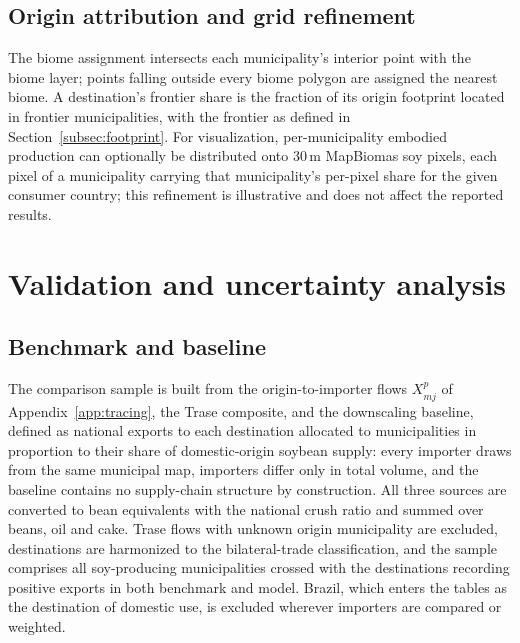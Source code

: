 \documentclass[pdflatex,sn-nature]{sn-jnl}%
\begin{document}
\subsection{Origin attribution and grid refinement}\label{subsubsec:attribution}
The biome assignment intersects each municipality's interior point with
the biome layer; points falling outside every biome polygon are assigned
the nearest biome. A destination's frontier share is the fraction of its
origin footprint located in frontier municipalities, with the frontier as
defined in Section~\ref{subsec:footprint}. For visualization, per-municipality embodied production can
optionally be distributed onto 30\,m MapBiomas soy pixels, each pixel of a
municipality carrying that municipality's per-pixel share for the given
consumer country; this refinement is illustrative and does not affect the
reported results.

\section{Validation and uncertainty analysis}\label{app:validation}

\subsection{Benchmark and baseline}\label{subsubsec:benchmarks}
The comparison sample is built from the origin-to-importer flows
$X^p_{mj}$ of Appendix~\ref{app:tracing}, the Trase composite, and the
downscaling baseline, defined as national exports to each destination
allocated to municipalities in proportion to their share of
domestic-origin soybean supply: every importer draws from the same
municipal map, importers differ only in total volume, and the baseline
contains no supply-chain structure by construction. All three sources
are converted to bean equivalents with the national crush ratio and
summed over beans, oil and cake. Trase flows with unknown origin
municipality are excluded, destinations are harmonized to the
bilateral-trade classification, and the sample comprises all
soy-producing municipalities crossed with the destinations recording
positive exports in both benchmark and model. Brazil, which enters the
tables as the destination of domestic use, is excluded wherever
importers are compared or weighted.
\end{document}
